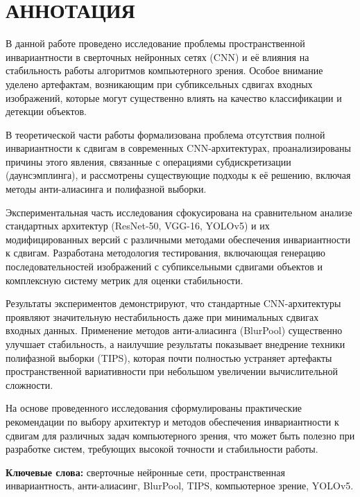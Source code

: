 \chapter*{АННОТАЦИЯ}

В данной работе проведено исследование проблемы пространственной инвариантности в сверточных нейронных сетях (CNN) и её влияния на стабильность работы алгоритмов компьютерного зрения. Особое внимание уделено артефактам, возникающим при субпиксельных сдвигах входных изображений, которые могут существенно влиять на качество классификации и детекции объектов.

В теоретической части работы формализована проблема отсутствия полной инвариантности к сдвигам в современных CNN-архитектурах, проанализированы причины этого явления, связанные с операциями субдискретизации (даунсэмплинга), и рассмотрены существующие подходы к её решению, включая методы анти-алиасинга и полифазной выборки.

Экспериментальная часть исследования сфокусирована на сравнительном анализе стандартных архитектур (ResNet-50, VGG-16, YOLOv5) и их модифицированных версий с различными методами обеспечения инвариантности к сдвигам. Разработана методология тестирования, включающая генерацию последовательностей изображений с субпиксельными сдвигами объектов и комплексную систему метрик для оценки стабильности.

Результаты экспериментов демонстрируют, что стандартные CNN-архитектуры проявляют значительную нестабильность даже при минимальных сдвигах входных данных. Применение методов анти-алиасинга (BlurPool) существенно улучшает стабильность, а наилучшие результаты показывает внедрение техники полифазной выборки (TIPS), которая почти полностью устраняет артефакты пространственной вариативности при небольшом увеличении вычислительной сложности.

На основе проведенного исследования сформулированы практические рекомендации по выбору архитектур и методов обеспечения инвариантности к сдвигам для различных задач компьютерного зрения, что может быть полезно при разработке систем, требующих высокой точности и стабильности работы.

\bigskip
\textbf{Ключевые слова:} сверточные нейронные сети, пространственная инвариантность, анти-алиасинг, BlurPool, TIPS, компьютерное зрение, YOLOv5.
